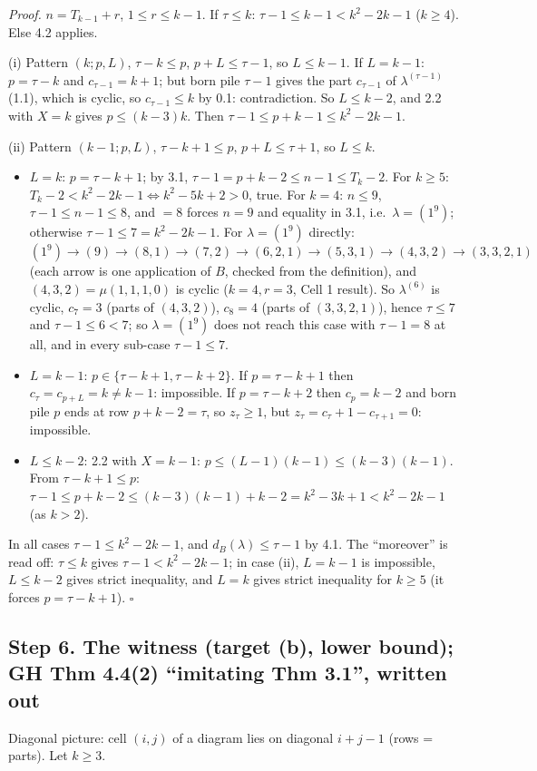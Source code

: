 \documentclass[11pt]{article}
\begin{document}
\emph{Proof.} $n=T_{k-1}+r$, $1\le r\le k-1$. If $\tau\le k$: $\tau-1\le k-1<k^2-2k-1$ ($k\ge4$). Else 4.2 applies.

(i) Pattern $(k;p,L)$, $\tau-k\le p$, $p+L\le\tau-1$, so $L\le k-1$. If $L=k-1$: $p=\tau-k$ and $c_{\tau-1}=k+1$; but born pile $\tau-1$ gives the part $c_{\tau-1}$ of $\lambda^{(\tau-1)}$ (1.1), which is cyclic, so $c_{\tau-1}\le k$ by 0.1: contradiction. So $L\le k-2$, and 2.2 with $X=k$ gives $p\le(k-3)k$. Then $\tau-1\le p+k-1\le k^2-2k-1$.

(ii) Pattern $(k-1;p,L)$, $\tau-k+1\le p$, $p+L\le\tau+1$, so $L\le k$.
\begin{itemize}
\item $L=k$: $p=\tau-k+1$; by 3.1, $\tau-1=p+k-2\le n-1\le T_k-2$. For $k\ge5$: $T_k-2<k^2-2k-1\iff k^2-5k+2>0$, true. For $k=4$: $n\le9$, $\tau-1\le n-1\le8$, and $=8$ forces $n=9$ and equality in 3.1, i.e.\ $\lambda=(1^9)$; otherwise $\tau-1\le7=k^2-2k-1$. For $\lambda=(1^9)$ directly:
\[(1^9)\to(9)\to(8,1)\to(7,2)\to(6,2,1)\to(5,3,1)\to(4,3,2)\to(3,3,2,1)\]
(each arrow is one application of $B$, checked from the definition), and $(4,3,2)=\mu(1,1,1,0)$ is cyclic ($k=4,r=3$, Cell 1 result). So $\lambda^{(6)}$ is cyclic, $c_7=3$ (parts of $(4,3,2)$), $c_8=4$ (parts of $(3,3,2,1)$), hence $\tau\le7$ and $\tau-1\le6<7$; so $\lambda=(1^9)$ does not reach this case with $\tau-1=8$ at all, and in every sub-case $\tau-1\le7$.
\item $L=k-1$: $p\in\{\tau-k+1,\tau-k+2\}$. If $p=\tau-k+1$ then $c_\tau=c_{p+L}=k\ne k-1$: impossible. If $p=\tau-k+2$ then $c_p=k-2$ and born pile $p$ ends at row $p+k-2=\tau$, so $z_\tau\ge1$, but $z_\tau=c_\tau+1-c_{\tau+1}=0$: impossible.
\item $L\le k-2$: 2.2 with $X=k-1$: $p\le(L-1)(k-1)\le(k-3)(k-1)$. From $\tau-k+1\le p$: $\tau-1\le p+k-2\le(k-3)(k-1)+k-2=k^2-3k+1<k^2-2k-1$ (as $k>2$).
\end{itemize}
In all cases $\tau-1\le k^2-2k-1$, and $d_B(\lambda)\le\tau-1$ by 4.1. The ``moreover'' is read off: $\tau\le k$ gives $\tau-1<k^2-2k-1$; in case (ii), $L=k-1$ is impossible, $L\le k-2$ gives strict inequality, and $L=k$ gives strict inequality for $k\ge5$ (it forces $p=\tau-k+1$). $\square$

\subsection*{Step 6. The witness (target (b), lower bound); GH Thm 4.4(2) ``imitating Thm 3.1'', written out}
Diagonal picture: cell $(i,j)$ of a diagram lies on diagonal $i+j-1$ (rows = parts). Let $k\ge3$.
\end{document}
